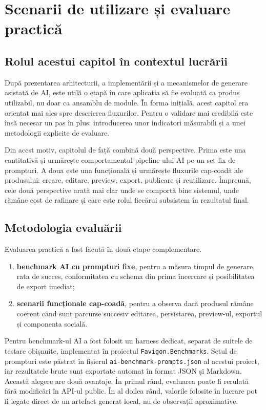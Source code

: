 \chapter{Scenarii de utilizare și evaluare practică}

\section{Rolul acestui capitol în contextul lucrării}

După prezentarea arhitecturii, a implementării și a mecanismelor de generare asistată de AI, este utilă o etapă în care aplicația să fie evaluată ca produs utilizabil, nu doar ca ansamblu de module. În forma inițială, acest capitol era orientat mai ales spre descrierea fluxurilor. Pentru o validare mai credibilă este însă necesar un pas în plus: introducerea unor indicatori măsurabili și a unei metodologii explicite de evaluare.

Din acest motiv, capitolul de față combină două perspective. Prima este una cantitativă și urmărește comportamentul pipeline-ului AI pe un set fix de prompturi. A doua este una funcțională și urmărește fluxurile cap-coadă ale produsului: creare, editare, preview, export, publicare și reutilizare. Împreună, cele două perspective arată mai clar unde se comportă bine sistemul, unde rămâne cost de rafinare și care este rolul fiecărui subsistem în rezultatul final.

\section{Metodologia evaluării}

Evaluarea practică a fost făcută în două etape complementare.

\begin{enumerate}[leftmargin=1.5cm]
  \item \textbf{benchmark AI cu prompturi fixe}, pentru a măsura timpul de generare, rata de succes, conformitatea cu schema din prima încercare și posibilitatea de export imediat;
  \item \textbf{scenarii funcționale cap-coadă}, pentru a observa dacă produsul rămâne coerent când sunt parcurse succesiv editarea, persistarea, preview-ul, exportul și componenta socială.
\end{enumerate}

Pentru benchmark-ul AI a fost folosit un harness dedicat, separat de suitele de testare obișnuite, implementat în proiectul \texttt{Favigon.Benchmarks}. Setul de prompturi este păstrat în fișierul \texttt{ai-benchmark-prompts.json} al acestui proiect, iar rezultatele brute sunt exportate automat în format JSON și Markdown. Această alegere are două avantaje. În primul rând, evaluarea poate fi rerulată fără modificări în API-ul public. În al doilea rând, valorile folosite în lucrare pot fi legate direct de un artefact generat local, nu de observații aproximative.

